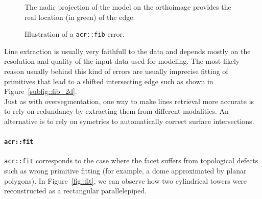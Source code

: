 \begin{figure}[htbp]
{\begin{subfloatrow}
{                                }{
                                    \caption{
                                        \label{subfig::fib_2d}
                                        The nadir projection of the model on the orthoimage provides the real location (in green) of the edge.
                                    }
                                }
                        \end{subfloatrow}
                    }{
                        \caption{
                            \label{fig::fib}
                            Illustration of a \texttt{\gls{acr::fib}} error.
                        }
                    }
                \end{figure}

                Line extraction is usually very faithfull to the data and depends mostly on the resolution and quality of the input data used for modeling.
                The most likely reason usually behind this kind of errors are usually imprecise fitting of primitives that lead to a shifted intersecting edge such as shown in Figure~\ref{subfig::fib_2d}.\\

                Just as with oversegmentation, one way to make lines retrieval more accurate is to rely on redundancy by extracting them from different modalities.
                An alternative is to rely on symetries \addref to automatically correct surface intersections.

            \paragraph{\texttt{\acrlong*{acr::fit}}}
                \texttt{\gls{acr::fit}} corresponds to the case where the facet suffers from topological defects such as wrong primitive fitting (for example, a dome approximated by planar polygons).
                In Figure~\ref{fig::fit}, we can observe how two cylindrical towers were reconstructed as a rectangular parallelepiped.\\

